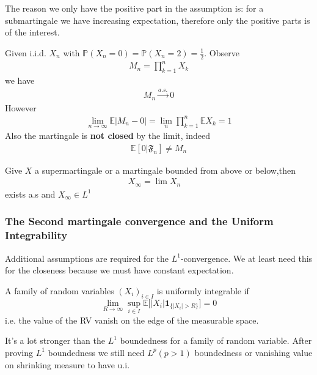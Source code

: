 \begin{remark}
The reason we only have the positive part in the assumption is: for a submartingale we have increasing expectation, therefore only the positive parts is of the interest.	
\end{remark}


\begin{example}
Given i.i.d. $X_n$ with $\mathbb{P}(X_n = 0) = \mathbb{P}(X_n = 2) = \frac{1}{2}$. Observe
\begin{align*}
	M_n = \prod_{k = 1}^n X_k
\end{align*}
we have
\begin{align*}
	M_n \overset{a.s.}{\rightarrow} 0
\end{align*}
However
\begin{align*}
	\lim_{n \rightarrow\infty}\mathbb{E}|M_n - 0|=\lim_n \prod_{k = 1}^n\mathbb{E}X_k = 1
\end{align*}
Also the martingale is \textbf{not closed} by the limit, indeed
\begin{align*}
	\mathbb{E}[0 | \mathfrak{F}_n] \neq M_n
\end{align*}
\end{example}

\begin{corollary}
	Give $X$ a supermartingale or a martingale bounded from above or below,then 
	\begin{align*}
		X_\infty = \lim X_n \quad
	\end{align*}
	exists a.s and $X_\infty \in L^1$
\end{corollary}



\subsubsection*{The Second martingale convergence and the Uniform Integrability}
Additional assumptions are required for the $L^1$-convergence. We at least need this for the closeness because we must have constant expectation. 
 \begin{definition}
 	A family of random variables $(X_i)_{i \in I}$ is uniformly integrable if
 	\begin{equation*}
 		\lim_{R \rightarrow \infty} \sup_{i \in I} \mathbb{E}\bigg[ |X_i| \textbf{1}_{\{|X_i| > R\}}\bigg] = 0
 	\end{equation*}
 	i.e. the value of the RV vanish on the edge of the measurable space.
 \end{definition}
\begin{remark}
	It's a lot stronger than the $L^1$ boundedness for a family of random variable. After proving $L^1$ boundedness we still need $L^p(p>1)$ boundedness or vanishing value on shrinking measure to have u.i.
\end{remark}

